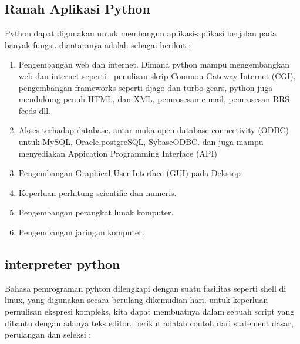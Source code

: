 \subsection{Ranah Aplikasi Python}
Python dapat digunakan untuk membangun aplikasi-aplikasi berjalan pada banyak fungsi. diantaranya adalah sebagai berikut :
\begin{enumerate}
\item Pengembangan web dan internet. Dimana python mampu mengembangkan web dan internet seperti : penulisan skrip Common Gateway Internet (CGI), pengembangan frameworks seperti djago dan turbo gears, python juga mendukung penuh HTML, dan XML, pemrosesan e-mail, pemrosesan RRS feeds dll.
\item Akses terhadap database. antar muka open database connectivity (ODBC) untuk MySQL, Oracle,postgreSQL, SybaseODBC. dan juga mampu menyediakan Appication Programming Interface (API)
\item Pengembangan Graphical User Interface (GUI) pada Dekstop
\item Keperluan perhitung scientific dan numeris.
\item Pengembangan perangkat lunak komputer.
\item Pengembangan jaringan komputer.
\end{enumerate}

\subsection{interpreter python}
Bahasa pemrograman pyhton dilengkapi dengan suatu fasilitas seperti shell di linux, yang digunakan secara berulang dikemudian hari. untuk keperluan pernulisan ekspresi kompleks, kita dapat membuatnya dalam sebuah script yang dibantu dengan adanya teks editor. berikut adalah contoh dari statement dasar, perulangan dan seleksi :

